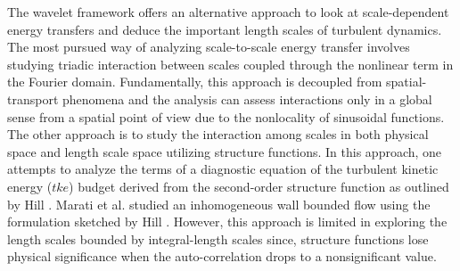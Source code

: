 The wavelet framework offers an alternative approach to look at scale-dependent energy transfers and deduce the important length scales of turbulent dynamics. The most pursued way of analyzing scale-to-scale energy transfer involves studying triadic interaction between scales coupled through the nonlinear term in the Fourier domain. Fundamentally, this approach is decoupled from spatial-transport phenomena and the analysis can assess interactions only in a global sense from a spatial point of view due to the nonlocality of sinusoidal functions. The other approach is to study the interaction among scales in both physical space and length scale  space utilizing structure functions. In this approach, one attempts to analyze the terms of a diagnostic equation of the turbulent kinetic energy ($tke$) budget derived from the second-order structure function as outlined by Hill \citep{hill_jfm2002}. Marati et al. \citep{marati_jfm_2004} studied an inhomogeneous wall bounded flow using the formulation sketched by Hill \citep{hill_jfm2002}. However, this approach is limited in exploring the length scales bounded by integral-length scales since, structure functions lose physical significance when the auto-correlation drops to a nonsignificant value. 

